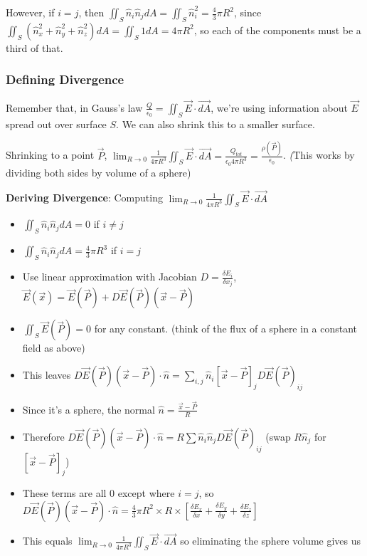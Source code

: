 \documentclass[11pt, oneside]{article}   	%
\begin{document}
 However, if $i = j$, then $\iint_S \hat{n}_i \hat{n}_j dA = \iint_S \hat{n}^2_i = \frac{4}{3}\pi R^2$, since $\iint_S (\hat{n}_x^2 + \hat{n}_y^2 + \hat{n}_z^2) dA = \iint_S 1 dA = 4 \pi R^2$, so each of the components must be a third of that.

\subsubsection{Defining Divergence}
Remember that, in Gauss's law $\frac{Q}{\epsilon_0} = \iint_S \vec{E} \cdot \vec{dA}$, we're using information about $\vec{E}$ spread out over surface $S$. We can also shrink this to a smaller surface.

Shrinking to a point $\vec{P}$, $\lim_{R \rightarrow 0} \frac{1}{4 \pi R^3}  \iint_S \vec{E} \cdot \vec{dA} = \frac{Q_{tot}}{\epsilon_0 4 \pi R^3} = \frac{\rho(\vec{P})}{\epsilon_0}$. \emph(This works by dividing both sides by volume of a sphere)

\textbf{Deriving Divergence}: Computing $\lim_{R \rightarrow 0} \frac{1}{4 \pi R^3}  \iint_S \vec{E} \cdot \vec{dA}$
\begin{itemize}
\item $\iint_S \hat{n}_i \hat{n}_j dA  = 0$ if $i \ne j$
\item $\iint_S \hat{n}_i \hat{n}_j dA  = \frac{4}{3} \pi R^3 $  if $i = j$
 \item Use linear approximation with Jacobian $D = \frac{\delta E_i}{\delta x_j}$, $\vec{E}(\vec{x}) = \vec{E}(\vec{P}) + D\vec{E}(\vec{P})(\vec{x} - \vec{P})$
 \item $\iint_S \vec{E}(\vec{P}) = 0$ for any constant.  (think of the flux of a sphere in a constant field as above)
\item This leaves $D\vec{E}(\vec{P})(\vec{x} - \vec{P}) \cdot \hat{n} = \sum_{i,j} \hat{n}_i [\vec{x}-\vec{P}]_j D\vec{E}(\vec{P})_{ij}$
\item Since it's a sphere, the normal $\hat{n} = \frac{\vec{x} - \vec{P}}{R}$
\item Therefore $D\vec{E}(\vec{P})(\vec{x} - \vec{P}) \cdot \hat{n} = R \sum \hat{n}_i \hat{n}_j  D\vec{E}(\vec{P})_{ij}$ (swap $R \hat{n}_j$ for $[\vec{x} - \vec{P}]_j$)
\item These terms are all 0 except where $i = j$, so $D\vec{E}(\vec{P})(\vec{x} - \vec{P}) \cdot \hat{n} = \frac{4}{3} \pi R^2 \times R \times
   [\frac{\delta E_x}{\delta x} +  \frac{\delta E_y}{\delta y} +  \frac{\delta E_z}{\delta z}]$
\item This equals $\lim_{R \rightarrow 0} \frac{1}{4 \pi R^3}  \iint_S \vec{E} \cdot \vec{dA}$ so eliminating the sphere volume gives us
\\
\end{itemize}
\end{document}
